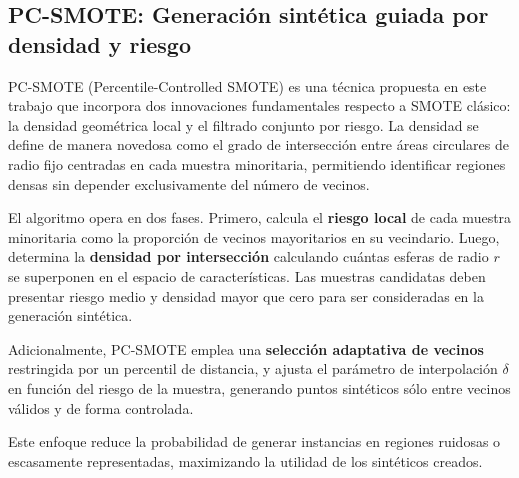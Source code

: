 
\subsection{PC-SMOTE: Generación sintética guiada por densidad y riesgo}

PC-SMOTE (Percentile-Controlled SMOTE) es una técnica propuesta en este trabajo que incorpora dos innovaciones fundamentales respecto a SMOTE clásico: la densidad geométrica local y el filtrado conjunto por riesgo. La densidad se define de manera novedosa como el grado de intersección entre áreas circulares de radio fijo centradas en cada muestra minoritaria, permitiendo identificar regiones densas sin depender exclusivamente del número de vecinos.

El algoritmo opera en dos fases. Primero, calcula el \textbf{riesgo local} de cada muestra minoritaria como la proporción de vecinos mayoritarios en su vecindario. Luego, determina la \textbf{densidad por intersección} calculando cuántas esferas de radio $r$ se superponen en el espacio de características. Las muestras candidatas deben presentar riesgo medio y densidad mayor que cero para ser consideradas en la generación sintética.

Adicionalmente, PC-SMOTE emplea una \textbf{selección adaptativa de vecinos} restringida por un percentil de distancia, y ajusta el parámetro de interpolación $\delta$ en función del riesgo de la muestra, generando puntos sintéticos sólo entre vecinos válidos y de forma controlada.

Este enfoque reduce la probabilidad de generar instancias en regiones ruidosas o escasamente representadas, maximizando la utilidad de los sintéticos creados.

